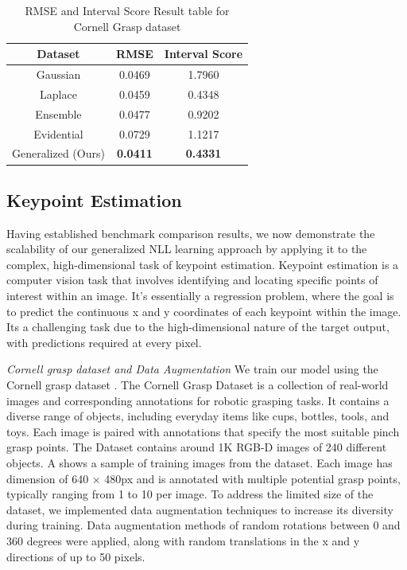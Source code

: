 \documentclass[letterpaper, 10 pt, conference]{ieeeconf}  %
\begin{document}
\begin{table}[b]
\centering
\begin{tabular}{ c|c|c }
Dataset & RMSE & Interval Score \\
 \hline
Gaussian & 0.0469 & 1.7960  \\
Laplace  & 0.0459 & 0.4348   \\
Ensemble  &  0.0477 & 0.9202  \\
Evidential  & 0.0729 & 1.1217  \\
Generalized (Ours) & \textbf{0.0411} & \textbf{0.4331}  \\
\hline
\end{tabular}
\caption{RMSE and Interval Score Result table for Cornell Grasp dataset}
\label{tab:Cornel}

\end{table}

\subsection{Keypoint Estimation}
Having established benchmark comparison results, we now demonstrate the scalability of our generalized NLL learning approach by applying it to the complex, high-dimensional task of keypoint estimation. 
Keypoint estimation is a computer vision task that involves identifying and locating specific points of interest within an image. It's essentially a regression problem, where the goal is to predict the continuous x and y coordinates of each keypoint within the image. Its a challenging task due to the high-dimensional nature of the target output, with predictions required at every pixel. 

\textit{Cornell grasp dataset and Data Augmentation}
We train our model using the Cornell grasp dataset \cite{lenz2015deep}. The Cornell Grasp Dataset is a collection of real-world images and corresponding annotations for robotic grasping tasks. It contains a diverse range of objects, including everyday items like cups, bottles, tools, and toys. Each image is paired with annotations that specify the most suitable pinch grasp points. The Dataset contains around 1K RGB-D images of 240 different objects.  A shows a sample of training images from the dataset. Each image has dimension of 640 × 480px and is annotated with multiple potential grasp points, typically ranging from 1 to 10 per image. 
To address the limited size of the dataset, we implemented data augmentation techniques to increase its diversity during training.
Data augmentation methods of random rotations between 0 and 360 degrees were applied, along with random translations in the x and y directions of up to 50 pixels. 
\end{document}
